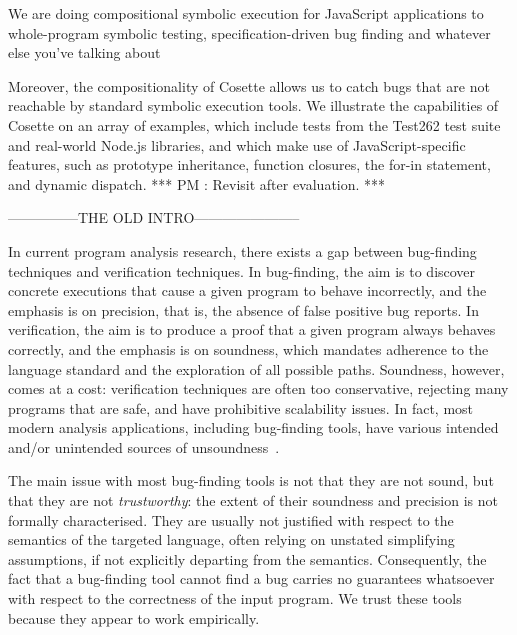 \documentclass[sigconf, anonymous, review]{acmart}
\newcommand{\polish}[1]{{\color{red}#1}}
\newcommand{\cosette}{Cosette\xspace}
\newcommand{\pmaxinline}[1]{ {\color{blue} *** PM : #1 ***} }
\newif\ifComments
\newcommand{\pmax}[1]{%
\ifComments
\begin{center}
\fbox{\begin{minipage}{0.4\textwidth} \color{blue}
{\rm PM: \small #1}
\end{minipage}}
\end{center}
\fi}
\begin{document}

We are doing compositional symbolic execution  for JavaScript 
applications to whole-program symbolic testing, specification-driven
bug finding and whatever else you've talking about 


Moreover, the compositionality of \cosette allows us to catch bugs that are not reachable by standard symbolic execution tools.
We illustrate the capabilities of \cosette on an array of examples, which include tests from the Test262 test suite and real-world Node.js libraries, and which make use of JavaScript-specific features, such as prototype inheritance, function closures, the for-in statement, and dynamic dispatch. \pmaxinline{Revisit after evaluation.}






---------------THE OLD INTRO-----------------------

\pmax{What is the reader supposed to learn?}

In current program analysis research, there exists a gap between bug-finding techniques and verification techniques. In bug-finding, the aim is to discover concrete executions that cause a given program to behave incorrectly, and the emphasis is on precision, that is, the absence of false positive bug reports. In verification, the aim is to produce a proof that a given program always behaves correctly, and the emphasis is on soundness, which mandates adherence to the language standard and the exploration of all possible paths.
%
Soundness, however, comes at a cost: verification techniques are often too conservative, rejecting many programs that are safe, and have prohibitive scalability issues. In fact, most modern analysis applications, including bug-finding tools, have various intended and/or unintended sources of unsoundness~\cite{soundyPaper}.
%

The main issue with most bug-finding tools is not that they are not sound, but that they are not \emph{trustworthy}: the extent of their soundness and precision is not formally characterised. They are usually not justified with respect to the semantics of the targeted language, often relying on unstated simplifying assumptions, if not explicitly departing from the semantics. Consequently, the fact that a bug-finding tool cannot find a bug carries no guarantees whatsoever with respect to the correctness of the input program. We trust these tools because they appear to work empirically.
\end{document}
